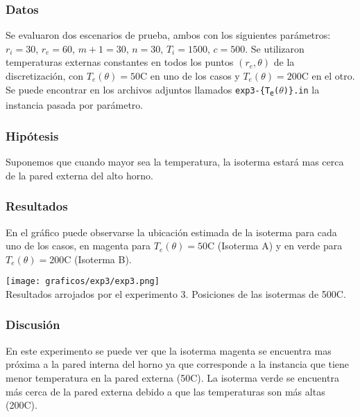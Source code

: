       \subsubsection*{Datos}
        Se evaluaron dos escenarios de prueba, ambos con los siguientes parámetros: $r_i = 30$, $r_e = 60$, $m+1 = 30$, $n = 30$, $T_i = 1500$, $c = 500$. Se utilizaron temperaturas externas constantes en todos los puntos $(r_e, \theta)$ de la discretización, con $T_e(\theta) = 50${\degree}C en uno de los casos y $T_e(\theta) = 200${\degree}C en el otro. Se puede encontrar en los archivos adjuntos llamados \texttt{exp3-\{T\textsubscript{e}($\theta$)\}.in} la instancia pasada por parámetro.

      \subsubsection*{Hipótesis}
        Suponemos que cuando mayor sea la temperatura, la isoterma estará mas cerca de la pared externa del alto horno. 

      \subsubsection*{Resultados}
        En el gráfico puede observarse la ubicación estimada de la isoterma para cada uno de los casos, en magenta para $T_e(\theta) = 50${\degree}C (Isoterma A) y en verde para $T_e(\theta) = 200${\degree}C (Isoterma B).
          
        \begin{minipage}{\textwidth} \begin{center}
          \texttt{[image: graficos/exp3/exp3.png]} \\
          {\small Resultados arrojados por el experimento 3. Posiciones de las isotermas de 500{\degree}C.}
        \end{center} \end{minipage}

      \subsubsection*{Discusión}
        En este experimento se puede ver que la isoterma magenta se encuentra mas próxima a la pared interna del horno ya que corresponde a la instancia que tiene menor temperatura en la pared externa (50{\degree}C). La isoterma verde se encuentra más cerca de la pared externa debido a que las temperaturas son más altas (200{\degree}C).

